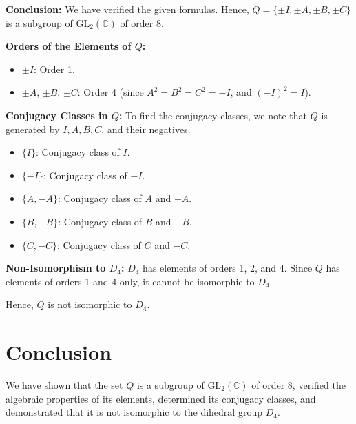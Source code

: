 \documentclass[12pt]{amsart}
\theoremstyle{definition}
\numberwithin{equation}{section}
\renewcommand{\C}{\mathbb{C}}
\begin{document}
\begin{exercise}{6}
    \noindent \textbf{Conclusion:}
    We have verified the given formulas. Hence, \(Q = \{\pm I, \pm A, \pm B, \pm C\} \) is a subgroup of \(\text{GL}_2(\C)\) of order 8.

    \noindent \textbf{Orders of the Elements of \(Q\):}
    \begin{itemize}
        \item \(\pm I\): Order 1.
        \item \(\pm A\), \(\pm B\), \(\pm C\): Order 4 (since \(A^2 = B^2 = C^2 = -I\), and \({(-I)}^2 = I\)).
    \end{itemize}

    \noindent \textbf{Conjugacy Classes in \(Q\):}
    To find the conjugacy classes, we note that \(Q\) is generated by \(I, A, B, C\), and their negatives.
    \begin{itemize}
        \item \( \{I\} \): Conjugacy class of \(I\).
        \item \( \{-I\} \): Conjugacy class of \(-I\).
        \item \( \{A, -A\} \): Conjugacy class of \(A\) and \(-A\).
        \item \( \{B, -B\} \): Conjugacy class of \(B\) and \(-B\).
        \item \( \{C, -C\} \): Conjugacy class of \(C\) and \(-C\).
    \end{itemize}

    \noindent \textbf{Non-Isomorphism to \(D_4\):}
    \(D_4\) has elements of orders 1, 2, and 4. Since \(Q\) has elements of orders 1 and 4 only, it cannot be isomorphic to \(D_4\).

    Hence, \(Q\) is not isomorphic to \(D_4\).

    \section*{Conclusion}
    We have shown that the set \(Q\) is a subgroup of \(\text{GL}_2(\C)\) of order 8, verified the algebraic properties of its elements, determined its conjugacy classes, and demonstrated that it is not isomorphic to the dihedral group \(D_4\).

\end{exercise}
\newpage
\end{document}
